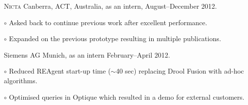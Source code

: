 \documentclass[letterpaper]{article}
\renewenvironment{itemize}{
  \begin{list}{}{
    \setlength{\leftmargin}{1.5em}
  }
}{
  \end{list}
}
\begin{document}
\begin{itemize}
\begin{itemize}
\end{itemize}
\item \textsc{Nicta} Canberra, ACT, Australia, as an intern, August--December 2012. 
\begin{itemize}
	 \item $\circ$ Asked back to continue previous work after excellent performance.
	 \item $\circ$ Expanded on the previous prototype resulting in multiple publications.
\end{itemize}
\item Siemens AG Munich, as an intern February--April 2012.
\begin{itemize}
     \item $\circ$ Reduced REAgent start-up time ({$\scriptstyle\sim$}40 sec) replacing Drool Fusion with ad-hoc algorithms.
     \item $\circ$ Optimised queries in Optique which resulted in a demo for external customers.


\end{itemize}
\end{itemize}
\end{document}
